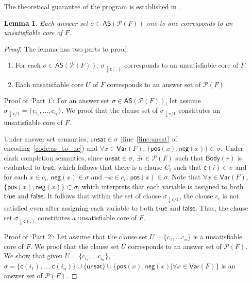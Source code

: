 \documentclass{article}
\newtheorem{lemma}{Lemma}
\newtheorem{proof}{Proof}
\newcommand{\unsat}{\ensuremath{\mathsf{unsat}}}
\newcommand{\pos}[1]{\ensuremath{\mathsf{pos}(#1)}}
\newcommand{\ngt}[1]{\ensuremath{\mathsf{neg}(#1)}}
\newcommand{\cls}[1]{\ensuremath{\mathsf{c}(#1)}}
\newcommand{\program}[1]{\mathcal{P}(#1)}
\newcommand{\body}[1]{\mathsf{Body}(#1)}
\newcommand{\true}{\ensuremath{\mathsf{true}}\xspace}
\newcommand{\false}{\ensuremath{\mathsf{false}}\xspace}
\newcommand{\Var}[1]{\mathsf{Var}(#1)}
\newcommand{\answer}[1]{\mathsf{AS}(#1)}
\begin{document}
The theoretical guarantee of the program is established in~.
\begin{lemma}
  \label{lemma:as_to_uc_proof}
  Each answer set $\sigma \in \answer{\program{F}}$ one-to-one corresponds to an unsatisfiable core of $F$.
\end{lemma}
\begin{proof}
  The lemma has two parts to proof:
  \begin{enumerate}
    \item For each $\sigma \in \answer{\program{F}}$, $\sigma_{\downarrow \cls{.}}$ corresponds to an unsatisfiable core of $F$
    \item Each unsatisfiable core $U$ of $F$ corresponds to an answer set of $\program{F}$ 
  \end{enumerate}
  Proof of `Part $1$': For an answer set $\sigma \in \answer{\program{F}}$, let assume $\sigma_{\downarrow c/1} = \{c_{i_1}, \ldots, c_{i_k}\}$.
  We proof that the clause set of $\sigma_{\downarrow c/1}$ constitutes an unsatisfiable core of $F$.

  Under answer set semantics, $\unsat \in \sigma$ (line~\ref{line:unsat} of encoding~\ref{code:as_to_uc}) and $\forall x \in \Var{F}$, $\{\pos{x}, \ngt{x}\} \subset \sigma$.
  Under clark completion semantics, since $\unsat \in \sigma$, $\exists r \in \program{F}$ such that 
  $\body{r}$ is evaluated to $\true$, which follows that there is a clause $C_i$ such that 
  $\cls{i} \in \sigma$ and for each $x \in c_i$, $\ngt{x} \in \sigma$ and $\neg{x} \in c_i$, $\pos{x} \in \sigma$.
  Note that $\forall x \in \Var{F}$, $\{\pos{x}, \ngt{x}\} \subset \sigma$, which interprets that each variable is assigned to both \true and \false.
  It follows that within the set of clause $\sigma_{\downarrow c/1}$, the clause $c_i$ is not satisfied even after assigning each variable to both \true and \false. 
  Thus, the clause set $\sigma_{\downarrow \cls{.}}$ constitutes a unsatisfiable core of $F$.

  Proof of `Part $2$': Let assume that the clause set $U = \{c_1, \ldots c_n\}$ is a unsatisfiable core of $F$.
  We proof that the clause set $U$ corresponds to an answer set of $\program{F}$. We show that given $U = \{c_{i_1}, \ldots c_{i_n}\}$, 
  $\sigma = \{\cls{i_1}, \ldots, \cls{i_n}\} \cup \{\unsat\} \cup \{\pos{x}, \ngt{x}| \forall x \in \Var{F}\}$ is an answer set of $\program{F}$.
  

\end{proof}
\end{document}
